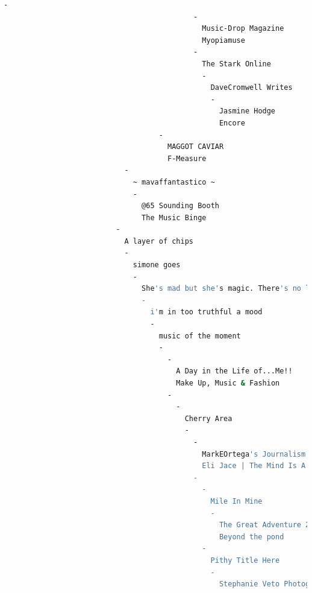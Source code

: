 \documentclass[a4paper, 11pt]{article}
\begin{document}
\begin{lstlisting}[language=bash, breakatwhitespace=〈false), label=Running makedend.py, caption=Running makedend.py]
                                          -
                                            -
                                              Music-Drop Magazine
                                              Myopiamuse
                                            -
                                              The Stark Online
                                              -
                                                DaveCromwell Writes
                                                -
                                                  Jasmine Hodge
                                                  Encore
                                    -
                                      MAGGOT CAVIAR
                                      F-Measure
                            -
                              ~ mavaffantastico ~
                              -
                                @65 Sounding Booth
                                The Music Binge
                          -
                            A layer of chips
                            -
                              simone goes
                              -
                                She's mad but she's magic. There's no lie in her fire.
                                -
                                  i'm in too truthful a mood
                                  -
                                    music of the moment
                                    -
                                      -
                                        A Day in the Life of...Me!!
                                        Make Up, Music & Fashion
                                      -
                                        -
                                          Cherry Area
                                          -
                                            -
                                              MarkEOrtega's Journalism Portfolio
                                              Eli Jace | The Mind Is A Terrible Thing To Paste
                                            -
                                              -
                                                Mile In Mine
                                                -
                                                  The Great Adventure 2016
                                                  Beyond the pond
                                              -
                                                Pithy Title Here
                                                -
                                                  Stephanie Veto Photography

\end{lstlisting}
\end{document}
